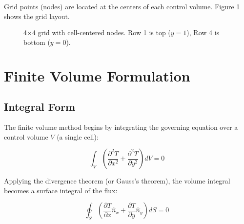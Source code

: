 \documentclass{article}
\begin{document}
Grid points (nodes) are located at the centers of each control volume. Figure \ref{fig:grid} shows the grid layout.

\begin{figure}[H]
\centering
{}
\caption{4$\times$4 grid with cell-centered nodes. Row 1 is top ($y=1$), Row 4 is bottom ($y=0$).}
\label{fig:grid}
\end{figure}

\section{Finite Volume Formulation}

\subsection{Integral Form}

The finite volume method begins by integrating the governing equation over a control volume $V$ (a single cell):

\begin{equation}
\int_{V} \left( \frac{\partial^2 T}{\partial x^2} + \frac{\partial^2 T}{\partial y^2} \right) dV = 0
\end{equation}

Applying the divergence theorem (or Gauss's theorem), the volume integral becomes a surface integral of the flux:

\begin{equation}
\oint_{S} \left( \frac{\partial T}{\partial x} \hat{n}_x + \frac{\partial T}{\partial y} \hat{n}_y \right) dS = 0
\label{eq:fluxbalance}
\end{equation}
\end{document}
